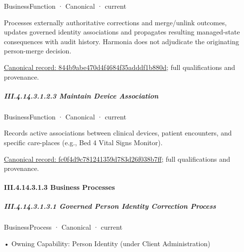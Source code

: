 \label{element:844b9abe470d4f4684f35adddf1b880d}
{\small BusinessFunction · Canonical · current}\par

Processes externally authoritative corrections and merge/unlink outcomes, updates governed identity associations and propagates resulting managed-state consequences with audit history. Harmonia does not adjudicate the originating person-merge decision.


{\footnotesize \href{../../../../../../../../continuum/business/business-function/844b9abe470d4f4684f35adddf1b880d.md}{Canonical record: 844b9abe470d4f4684f35adddf1b880d}; full qualifications and provenance.}\par
\subparagraph*{III.4.14.3.1.2.3 Maintain Device Association}
\label{navigation:III.4.14.3.1.2.3}

\label{element:fc0f4d9c781241359d783d26f038b7ff}
{\small BusinessFunction · Canonical · current}\par

Records active associations between clinical devices, patient encounters, and specific care-places (e.g., Bed 4 Vital Signs Monitor).


{\footnotesize \href{../../../../../../../../continuum/business/business-function/fc0f4d9c781241359d783d26f038b7ff.md}{Canonical record: fc0f4d9c781241359d783d26f038b7ff}; full qualifications and provenance.}\par
\paragraph*{III.4.14.3.1.3 Business Processes}
\label{navigation:III.4.14.3.1.3}

\subparagraph*{III.4.14.3.1.3.1 Governed Person Identity Correction Process}
\label{navigation:III.4.14.3.1.3.1}

\label{element:72f3c63da45d44868579a3bb15d1568c}
{\small BusinessProcess · Canonical · current}\par

•
Owning Capability: Person Identity (under Client Administration)



